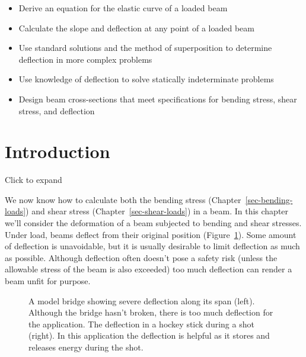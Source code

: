 \documentclass[
  letterpaper,
  DIV=11,
  numbers=noendperiod]{scrreprt}
\providecommand{\tightlist}{%
  \setlength{\itemsep}{0pt}\setlength{\parskip}{0pt}}\usepackage{longtable,booktabs,array}
\theoremstyle{definition}
\theoremstyle{remark}
\begin{document}
\begin{tcolorbox}[enhanced jigsaw, leftrule=.75mm, bottomrule=.15mm, opacityback=0, opacitybacktitle=0.6, colframe=quarto-callout-note-color-frame, toprule=.15mm, colbacktitle=quarto-callout-note-color!10!white, coltitle=black, bottomtitle=1mm, title={Learning Objectives}, titlerule=0mm, toptitle=1mm, colback=white, rightrule=.15mm, left=2mm, arc=.35mm, breakable]

\begin{itemize}
\tightlist
\item
  Derive an equation for the elastic curve of a loaded beam
\item
  Calculate the slope and deflection at any point of a loaded beam
\item
  Use standard solutions and the method of superposition to determine
  deflection in more complex problems
\item
  Use knowledge of deflection to solve statically indeterminate problems
\item
  Design beam cross-sections that meet specifications for bending
  stress, shear stress, and deflection
\end{itemize}

\end{tcolorbox}

\section*{Introduction}\label{introduction-10}


Click to expand

We now know how to calculate both the bending stress
(Chapter~\ref{sec-bending-loads}) and shear stress
(Chapter~\ref{sec-shear-loads}) in a beam. In this chapter we'll
consider the deformation of a beam subjected to bending and shear
stresses. Under load, beams deflect from their original position
(Figure~\ref{fig-11.1}). Some amount of deflection is unavoidable, but
it is usually desirable to limit deflection as much as possible.
Although deflection often doesn't pose a safety risk (unless the
allowable stress of the beam is also exceeded) too much deflection can
render a beam unfit for purpose.

\begin{figure}


\caption{\label{fig-11.1}A model bridge showing severe deflection along
its span (left). Although the bridge hasn't broken, there is too much
deflection for the application. The deflection in a hockey stick during
a shot (right). In this application the deflection is helpful as it
stores and releases energy during the shot.}

\end{figure}%
\end{document}
